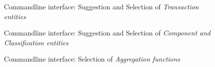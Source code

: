 \begin{figure}[p]
  
  \caption{Commandline interface: Suggestion and Selection of \emph{Transaction entities}}
  \label{fig:transactionSuggestion}
\end{figure}

\begin{figure}[p]
  
  \caption{Commandline interface: Suggestion and Selection of \emph{Component and Classification entities}}
  \label{fig:dimensionalModelSuggestion}
\end{figure}

\begin{figure}[p]
  
  \caption{Commandline interface: Selection of \emph{Aggregation functions}}
  \label{fig:aggregationSelection}
\end{figure}

